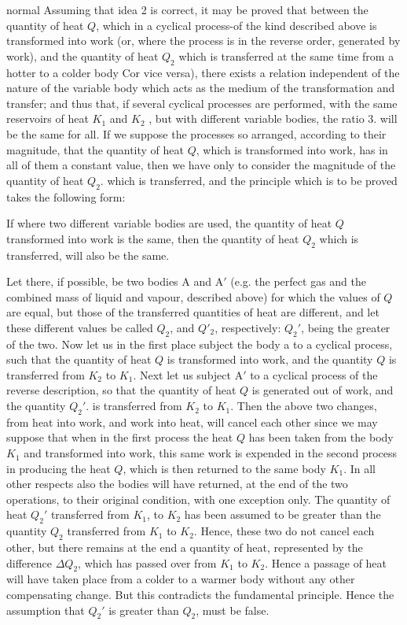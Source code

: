 \begin{solution}{normal}
Assuming that idea 2 is correct, it may be proved that between the quantity of heat $Q$, which in a cyclical process-of the kind described above is transformed into work (or, where the process is in the reverse order, generated by work), and the quantity of heat $Q_2$ which is transferred at the same time from a hotter to a colder body Cor vice versa), there exists a relation independent of the nature of the variable body which acts as the medium of the transformation and transfer; and thus that, if several cyclical processes are performed, with the same reservoirs of heat $K_1$ and $K_2$ , but with different variable bodies, the ratio 3. will be the same for all. If we suppose the processes so arranged, according to their magnitude, that the quantity of heat $Q$, which is transformed into work, has in all of them a constant value, then we have only to consider the magnitude of the quantity of heat $Q_2$. which is transferred, and the principle which is to be proved takes the following form: 
\vspace{3mm}

If where two different variable bodies are used, the quantity of heat $Q$ transformed into work is the same, then the quantity of heat $Q_2$ which is transferred, will also be the same.
\vspace{3mm}

Let there, if possible, be two bodies $\text{A}$ and $\text{A}'$ (e.g. the perfect gas and the combined mass of liquid and vapour, described above) for which the values of $Q$ are equal, but those of the transferred quantities of heat are different, and let these different values be called $Q_2$, and $Q'_2$, respectively: $Q_2'$, being the greater of the two. Now let us in the first place subject the body a to a cyclical process, such that the quantity of heat $Q$ is transformed into work, and the quantity $Q$ is transferred from $K_2$ to $K_1$. Next let us subject $\text{A}'$ to a cyclical process of the reverse description, so that the quantity of heat $Q$ is generated out of work, and the quantity $Q_2'$. is transferred from $K_2$ to $K_1$. Then the above two changes, from heat into work, and work into heat, will cancel each other since we may suppose that when in the first process the heat $Q$ has been taken from the body $K_1$ and transformed into work, this same work is expended in the second process in producing the heat $Q$, which is then returned to the same body $K_1$. In all other respects also the bodies will have returned, at the end of the two operations, to their original condition, with one exception only. The quantity of heat $Q_2'$ transferred from $K_1$, to $K_2$ has been assumed to be greater than the quantity $Q_2$ transferred from $K_1$ to $K_2$. Hence, these two do not cancel each other, but there remains at the end a quantity of heat, represented by the difference $\Delta Q_2$, which has passed over from $K_1$ to $K_2$. Hence a passage of heat will have taken place from a colder to a warmer body without any other compensating change. But this contradicts the fundamental principle. Hence the assumption that $Q_2'$ is greater than $Q_2$, must be false. 
\vspace{3mm}


\end{solution}
